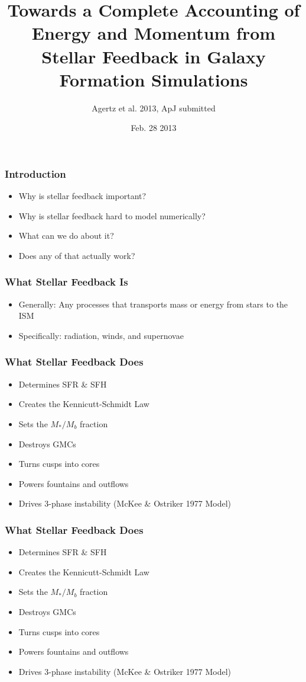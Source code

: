 \documentclass[serif,mathserif]{beamer}
\author{Agertz et al. 2013, ApJ submitted}
\title[Energy and Momentum From Stellar
Feedback\hspace{2em}\insertframenumber/\inserttotalframenumber]{Towards a
	Complete Accounting of Energy and Momentum from Stellar Feedback in Galaxy
Formation Simulations}
\date{Feb. 28 2013} %
\institute{McMaster Physics \& Astronomy Journal Club}
\begin{document}
\maketitle

\begin{frame}
  \frametitle{Introduction}
  \begin{itemize}
	  \item Why is stellar feedback important?
	  \item Why is stellar feedback hard to model numerically?
	  \item What can we do about it?
	  \item Does any of that actually work?
  \end{itemize}
\end{frame}

\begin{frame}
  \frametitle{What Stellar Feedback Is}
  \begin{itemize}
	  \item Generally: Any processes that transports mass or energy from stars
		  to the ISM
	  \item Specifically: radiation, winds, and supernovae
  \end{itemize}
\end{frame}

\begin{frame}
  \frametitle{What Stellar Feedback Does}
  \begin{itemize}
	  \item Determines SFR \& SFH
	  \item Creates the Kennicutt-Schmidt Law
	  \item Sets the $M_*/M_b$ fraction
	  \item Destroys GMCs
	  \item Turns cusps into cores 
	  \item Powers fountains and outflows
	  \item Drives 3-phase instability (McKee \& Ostriker 1977 Model)
  \end{itemize}
\end{frame}

\begin{frame}
  \frametitle{What Stellar Feedback Does}
  \begin{itemize}
	  \item {\color{red} Determines SFR \& SFH}
	  \item {\color{red} Creates the Kennicutt-Schmidt Law}
	  \item {\color{red} Sets the $M_*/M_b$ fraction}
	  \item Destroys GMCs
	  \item Turns cusps into cores 
	  \item Powers fountains and outflows
	  \item Drives 3-phase instability (McKee \& Ostriker 1977 Model)
  \end{itemize}
\end{frame}
\end{document}
